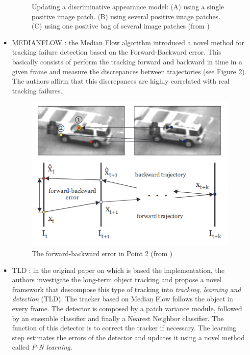 \begin{itemize}
\begin{figure}[H]
\begin{center}
\caption{Updating a discriminative appearance model: (A) using a single positive image patch. (B) using several positive image patches. (C) using one positive bag of several image patches (from \cite{babenko2009visual})}
\label{fig:mil}
\end{center}
\end{figure}
\item MEDIANFLOW \cite{kalal2010forward}: the Median Flow algorithm introduced a novel method for tracking failure detection based on the Forward-Backward error. This  basically consists of perform the tracking forward and backward in time in a given frame and measure the discrepances between trajectories (see Figure \ref{fig:medianflow}). The authors affirm that this discrepances are highly correlated with real tracking failures.
\begin{figure}[H]
\begin{center}
\includegraphics[scale=0.4]{figures/medianflow.png}
\caption{The forward-backward error in Point 2 (from \cite{kalal2010forward})}
\label{fig:medianflow}
\end{center}
\end{figure}    
\item TLD \cite{kalal2011tracking}: in the original paper on which is based the implementation, the authors investigate the long-term object tracking and propose a novel framework that descompose this type of tracking into \textit{tracking, learning and detection} (TLD). The tracker based on Median Flow follows the object in every frame. The detector is composed by a patch variance module, followed by an ensemble classifier and finally a Nearest Neighbor classifier. The function of this detector is to correct the tracker if necessary. The learning step estimates the errors of the detector and updates it using a novel method called \textit{P-N learning}.

\end{itemize}
